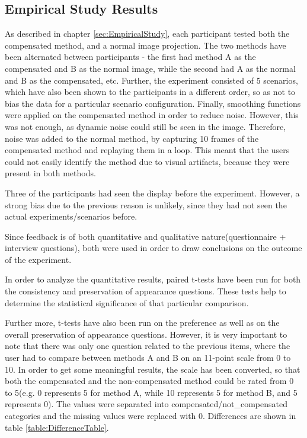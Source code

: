 \documentclass[]{article}
\begin{document}
\subsection{Empirical Study Results}
\label{sec:Empirical Study Results}
 As described in chapter \ref{sec:EmpiricalStudy}, each participant tested both the compensated method, and a normal image projection. The two methods have been alternated between participants - the first had method A as the compensated and B as the normal image, while the second had A as the normal and B as the compensated, etc. Further, the experiment consisted of 5 scenarios, which have also been shown to the participants in a different order, so as not to bias the data for a particular scenario configuration. Finally, smoothing functions were applied on the compensated method in order to reduce noise. However, this was not enough, as dynamic noise could still be seen in the image. Therefore, noise was added to the normal method, by capturing 10 frames of the compensated method and replaying them in a loop. This meant that the users could not easily identify the method due to visual artifacts, because they were present in both methods.

Three of the participants had seen the display before the experiment. However, a strong bias due to the previous reason is unlikely, since they had not seen the actual experiments/scenarios before.

Since feedback is of both quantitative and qualitative nature(questionnaire + interview questions), both were used in order to draw conclusions on the outcome of the experiment.

In order to analyze the quantitative results, paired t-tests have been run for both the consistency and preservation of appearance questions. These tests help to determine the statistical significance of that particular comparison.

Further more, t-tests have also been run on the preference as well as on the overall preservation of appearance questions. However, it is very important to note that there was only one question related to the previous items, where the user had to compare between methods A and B on an 11-point scale from 0 to 10. In order to get some meaningful results, the scale has been converted, so that both the compensated and the non-compensated method could be rated from 0 to 5(e.g. 0 represents 5 for method A, while 10 represents 5 for method B, and 5 represents 0). The values were separated into compensated/not\_compensated categories and the missing values were replaced with 0. Differences are shown in table \ref{table:DifferenceTable}.
\end{document}
